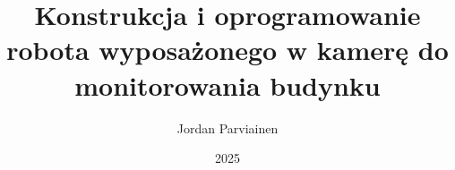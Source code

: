\documentclass[thesis=inz,faculty=ee]{EE-dyplom}
\title{Konstrukcja i oprogramowanie robota wyposażonego w kamerę do monitorowania budynku}
\author{Jordan Parviainen}
\date{2025}
\begin{document}
    \frontpages

    

    \bibliografia

    
    \listoffigures
\end{document}
